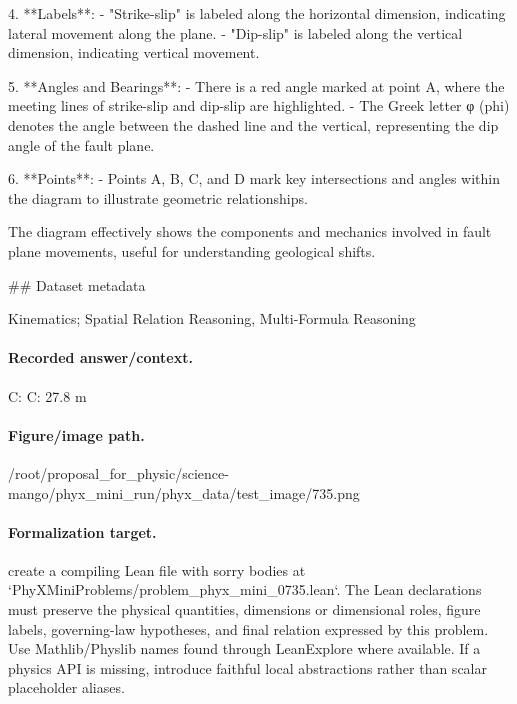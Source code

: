 4. **Labels**: 
   - "Strike-slip" is labeled along the horizontal dimension, indicating lateral movement along the plane.
   - "Dip-slip" is labeled along the vertical dimension, indicating vertical movement.
   
5. **Angles and Bearings**: 
   - There is a red angle marked at point A, where the meeting lines of strike-slip and dip-slip are highlighted. 
   - The Greek letter φ (phi) denotes the angle between the dashed line and the vertical, representing the dip angle of the fault plane.

6. **Points**: 
   - Points A, B, C, and D mark key intersections and angles within the diagram to illustrate geometric relationships.

The diagram effectively shows the components and mechanics involved in fault plane movements, useful for understanding geological shifts.

\#\# Dataset metadata

Kinematics; Spatial Relation Reasoning, Multi-Formula Reasoning

\paragraph{Recorded answer/context.}
C: C: 27.8 m

\paragraph{Figure/image path.}
/root/proposal\_for\_physic/science-mango/phyx\_mini\_run/phyx\_data/test\_image/735.png

\paragraph{Formalization target.}
create a compiling Lean file with sorry bodies at `PhyXMiniProblems/problem\_phyx\_mini\_0735.lean`. The Lean declarations must preserve the physical quantities, dimensions or dimensional roles, figure labels, governing-law hypotheses, and final relation expressed by this problem.
Use Mathlib/Physlib names found through LeanExplore where available. If a physics API is missing, introduce faithful local abstractions rather than scalar placeholder aliases.

